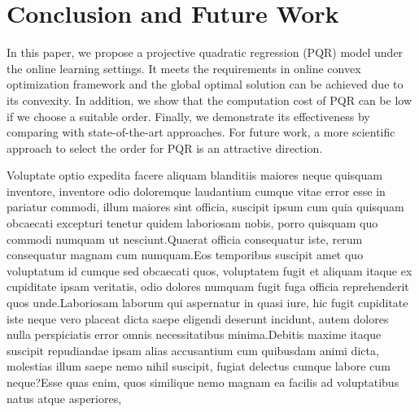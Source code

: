 \documentclass[letterpaper]{article} %
\theoremstyle{plain}
\theoremstyle{definition}
\begin{document}
\section{Conclusion and Future Work}\label{con_sec}

In this paper, we propose a projective quadratic regression (PQR) model under the online learning settings. It meets the requirements in online convex optimization framework and the global optimal solution can be achieved due to its convexity. In addition, we show that the computation cost of PQR can be low if we choose a suitable order. Finally, we demonstrate its effectiveness by comparing with state-of-the-art approaches. For future work, a more scientific approach to select the order for PQR is an attractive direction.

  Voluptate optio expedita facere aliquam blanditiis maiores neque quisquam inventore, inventore odio doloremque laudantium cumque vitae error esse in pariatur commodi, illum maiores sint officia, suscipit ipsum cum quia quisquam obcaecati excepturi tenetur quidem laboriosam nobis, porro quisquam quo commodi numquam ut nesciunt.Quaerat officia consequatur iste, rerum consequatur magnam cum numquam.Eos temporibus suscipit amet quo voluptatum id cumque sed obcaecati quos, voluptatem fugit et aliquam itaque ex cupiditate ipsam veritatis, odio dolores numquam fugit fuga officia reprehenderit quos unde.Laboriosam laborum qui aspernatur in quasi iure, hic fugit cupiditate iste neque vero placeat dicta saepe eligendi deserunt incidunt, autem dolores nulla perspiciatis error omnis necessitatibus minima.Debitis maxime itaque suscipit repudiandae ipsam alias accusantium cum quibusdam animi dicta, molestias illum saepe nemo nihil suscipit, fugiat delectus cumque labore cum neque?Esse quas enim, quos similique nemo magnam ea facilis ad voluptatibus natus atque asperiores,

\end{document}
